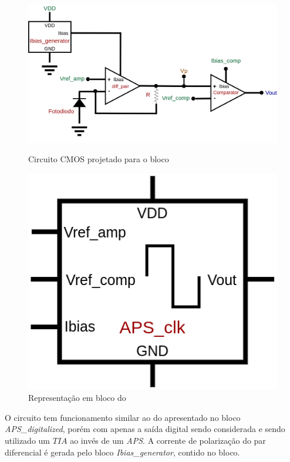 \begin{figure}[htb]
 \centering
    \centering
    \caption{Circuito CMOS projetado para o bloco \NomeBloco} 
    \includegraphics[scale=0.3]{Circuitos/APS_clk.png}
    \label{\NomePFig}
\end{figure}

\begin{figure}[htb]
 \centering
    \centering
    \caption{Representação em bloco do \NomeBloco} \label{\NomeSFig}
    \includegraphics[scale=0.3]{Circuitos/APS_clk_block.png}
\end{figure}

O circuito tem funcionamento similar ao do apresentado no bloco \textit{APS\_digitalized}, por\'em com apenas a sa\'ida digital sendo considerada e sendo utilizado um $TIA$ ao inv\'es de um \textit{APS}. A corrente de polarização do par diferencial \'e gerada pelo bloco \textit{Ibias\_generator}, contido no bloco.

